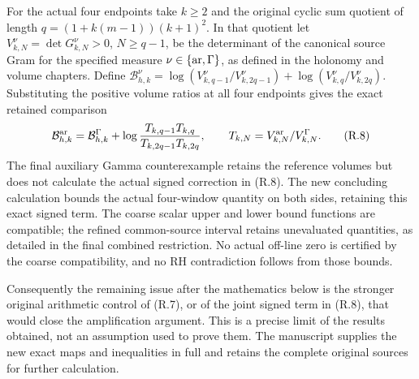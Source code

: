 For the actual four endpoints take $k\ge2$ and the original cyclic
sum quotient of length $q=(1+k(m-1))(k+1)^2$. In that quotient let
$V^\nu_{k,N}=\det G^\nu_{k,N}>0$, $N\ge q-1$, be the determinant
of the canonical source Gram for the specified measure
$\nu\in\{{\rm ar},\Gamma\}$, as defined in the holonomy and
volume chapters. Define
$\mathcal B^\nu_{h,k}=\log(V^\nu_{k,q-1}/V^\nu_{k,2q-1})
+\log(V^\nu_{k,q}/V^\nu_{k,2q})$.
Substituting the positive volume ratios at all four endpoints gives
the exact retained comparison
\[
\mathcal B^{\rm ar}_{h,k}=\mathcal B^\Gamma_{h,k}
+\log\frac{T_{k,q-1}T_{k,q}}
{T_{k,2q-1}T_{k,2q}},\qquad
T_{k,N}=V^{\rm ar}_{k,N}/V^\Gamma_{k,N}.                \tag{R.8}
\]
The final auxiliary Gamma counterexample retains the reference volumes
but does not calculate the actual signed correction in (R.8).
The new concluding calculation bounds the actual four-window quantity
on both sides, retaining this exact signed term. The coarse scalar
upper and lower bound functions are compatible; the refined common-source
interval retains unevaluated quantities, as detailed in the final
combined restriction. No actual off-line zero is certified by the coarse
compatibility, and no RH contradiction follows from those bounds.

Consequently the remaining issue after the mathematics below is the
stronger original arithmetic control of (R.7), or of the joint signed
term in (R.8), that would close the amplification argument. This is a
precise limit of the results obtained, not an assumption used to prove
them. The manuscript supplies the new exact maps and inequalities in
full and retains the complete original sources for further calculation.
